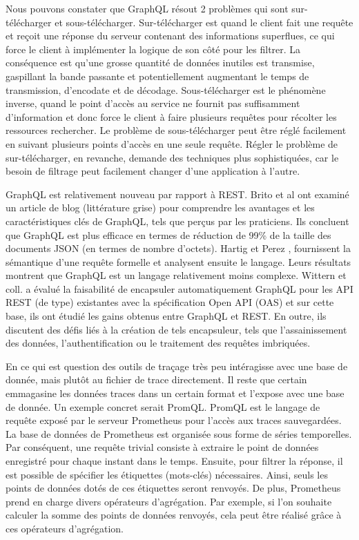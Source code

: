 Nous pouvons constater que GraphQL résout 2 problèmes qui sont sur-télécharger et sous-télécharger. Sur-télécharger est quand le client fait une requête et reçoit une réponse du serveur contenant des informations superflues, ce qui force le client à implémenter la logique de son côté pour les filtrer. La conséquence est qu'une grosse quantité de données inutiles est transmise, gaspillant la bande passante et potentiellement augmentant le temps de transmission, d'encodate et de décodage. Sous-télécharger est le phénomène inverse, quand le point d'accès au service ne fournit pas suffisamment d'information et donc force le client à faire plusieurs requêtes pour récolter les ressources rechercher. Le problème de sous-télécharger peut être réglé facilement en suivant plusieurs points d'accès en une seule requête. Régler le problème de sur-télécharger, en revanche, demande des techniques plus sophistiquées, car le besoin de filtrage peut facilement changer d'une application à l'autre. \cite{Vadlamani2021}



GraphQL est relativement nouveau par rapport à REST. Brito et al \cite{Brito2019} ont examiné un article de blog (littérature grise) pour comprendre les avantages et les caractéristiques clés de GraphQL, tels que perçus par les praticiens. Ils concluent que GraphQL est plus efficace en termes de réduction de 99\% de la taille des documents JSON (en termes de nombre d'octets). Hartig et Perez \cite{hartig2017initial}, \cite{hartig2018semantics} fournissent la sémantique d'une requête formelle et analysent ensuite le langage. Leurs résultats montrent que GraphQL est un langage relativement moins complexe. Wittern et coll. \cite{wittern2018generating} a évalué la faisabilité de encapsuler automatiquement GraphQL pour les API REST (de type) existantes avec la spécification Open API (OAS) et sur cette base, ils ont étudié les gains obtenus entre GraphQL et REST. En outre, ils discutent des défis liés à la création de tels encapsuleur, tels que l'assainissement des données, l'authentification ou le traitement des requêtes imbriquées.

En ce qui est question des outils de traçage très peu intéragisse avec une base de donnée, mais plutôt au fichier de trace directement. Il reste que certain emmagasine les données traces dans un certain format et l'expose avec une base de donnée. Un exemple concret serait PromQL. PromQL est le langage de requête exposé par le serveur Prometheus pour l'accès aux traces sauvegardées. La base de données de Prometheus est organisée sous forme de séries temporelles. Par conséquent, une requête trivial consiste à extraire le point de données enregistré pour chaque instant dans le temps. Ensuite, pour filtrer la réponse, il est possible de spécifier les étiquettes (mots-clés) nécessaires. Ainsi, seuls les points de données dotés de ces étiquettes seront renvoyés. De plus, Prometheus prend en charge divers opérateurs d'agrégation. Par exemple, si l'on souhaite calculer la somme des points de données renvoyés, cela peut être réalisé grâce à ces opérateurs d'agrégation.

